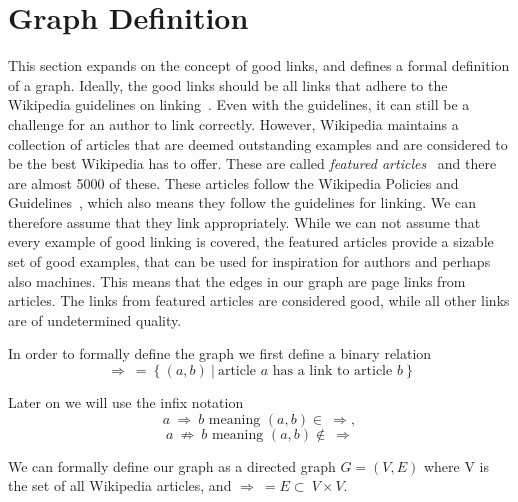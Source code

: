 \section{Graph Definition}
This section expands on the concept of good links, and defines a formal definition of a graph. Ideally, the good links should be all links that adhere to the Wikipedia guidelines on linking~\cite{wiki-manual-of-style-guidelines}. Even with the guidelines, it can still be a challenge for an author to link correctly. However, Wikipedia maintains a collection of articles that are deemed outstanding examples and are considered to be the best Wikipedia has to offer. These are called \emph{featured articles}~\cite{wiki-featured-articles} and there are almost 5000 of these. These articles follow the Wikipedia Policies and Guidelines~\cite{wiki-editor-guidelines}, which also means they follow the guidelines for linking. We can therefore assume that they link appropriately. While we can not assume that every example of good linking is covered, the featured articles provide a sizable set of good examples, that can be used for inspiration for authors and perhaps also machines. This means that the edges in our graph are page links from articles. The links from featured articles are considered good, while all other links are of undetermined quality.

In order to formally define the graph we first define a binary relation $$\Rightarrow\ =\ \{\ (a,b)\ |\ \text{article } a \text{ has a link to article } b\ \}$$

Later on we will use the infix notation $$a\ \Rightarrow\ b \text{ meaning } (a,b) \in\ \Rightarrow,$$ $$a\ \not\Rightarrow\ b \text{ meaning } (a,b) \not\in\ \Rightarrow$$

We can formally define our graph as a directed graph $G = (V,E)$ where V is the set of all Wikipedia articles, and $\Rightarrow\ = E\subset\ V \times V$.

